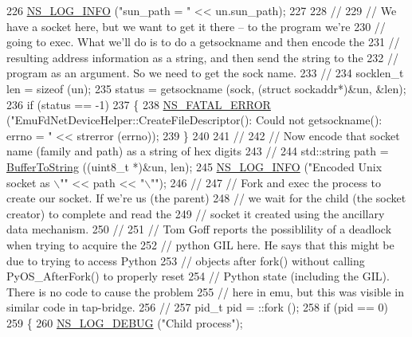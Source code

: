 \begin{DoxyCode}
226   \hyperlink{group__logging_gafbd73ee2cf9f26b319f49086d8e860fb}{NS\_LOG\_INFO} (\textcolor{stringliteral}{"sun\_path = "} << un.sun\_path);
227 
228   \textcolor{comment}{//}
229   \textcolor{comment}{// We have a socket here, but we want to get it there -- to the program we're}
230   \textcolor{comment}{// going to exec.  What we'll do is to do a getsockname and then encode the}
231   \textcolor{comment}{// resulting address information as a string, and then send the string to the}
232   \textcolor{comment}{// program as an argument.  So we need to get the sock name.}
233   \textcolor{comment}{//}
234   socklen\_t len = \textcolor{keyword}{sizeof} (un);
235   status = getsockname (sock, (\textcolor{keyword}{struct} sockaddr*)&un, &len);
236   \textcolor{keywordflow}{if} (status == -1)
237     \{
238       \hyperlink{group__fatal_ga5131d5e3f75d7d4cbfd706ac456fdc85}{NS\_FATAL\_ERROR} (\textcolor{stringliteral}{"EmuFdNetDeviceHelper::CreateFileDescriptor(): Could not getsockname():
       errno = "} << strerror (errno));
239     \}
240 
241   \textcolor{comment}{//}
242   \textcolor{comment}{// Now encode that socket name (family and path) as a string of hex digits}
243   \textcolor{comment}{//}
244   std::string path = \hyperlink{namespacens3_a97907497171f00140c77ed054e3baad6}{BufferToString} ((uint8\_t *)&un, len);
245   \hyperlink{group__logging_gafbd73ee2cf9f26b319f49086d8e860fb}{NS\_LOG\_INFO} (\textcolor{stringliteral}{"Encoded Unix socket as \(\backslash\)""} << path << \textcolor{stringliteral}{"\(\backslash\)""});
246   \textcolor{comment}{//}
247   \textcolor{comment}{// Fork and exec the process to create our socket.  If we're us (the parent)}
248   \textcolor{comment}{// we wait for the child (the socket creator) to complete and read the}
249   \textcolor{comment}{// socket it created using the ancillary data mechanism.}
250   \textcolor{comment}{//}
251   \textcolor{comment}{// Tom Goff reports the possiblility of a deadlock when trying to acquire the}
252   \textcolor{comment}{// python GIL here.  He says that this might be due to trying to access Python}
253   \textcolor{comment}{// objects after fork() without calling PyOS\_AfterFork() to properly reset}
254   \textcolor{comment}{// Python state (including the GIL).  There is no code to cause the problem}
255   \textcolor{comment}{// here in emu, but this was visible in similar code in tap-bridge.}
256   \textcolor{comment}{//}
257   pid\_t pid = ::fork ();
258   \textcolor{keywordflow}{if} (pid == 0)
259     \{
260       \hyperlink{group__logging_ga413f1886406d49f59a6a0a89b77b4d0a}{NS\_LOG\_DEBUG} (\textcolor{stringliteral}{"Child process"});

\end{DoxyCode}
